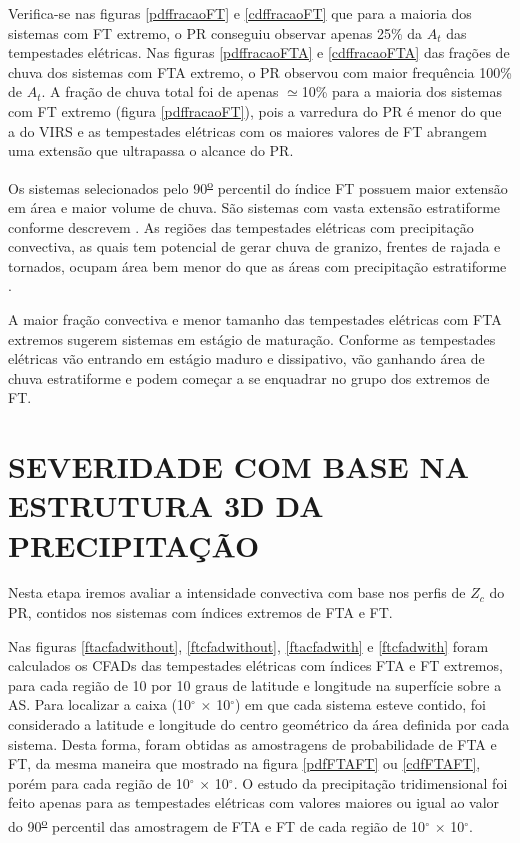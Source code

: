 Verifica-se nas figuras \ref{pdffracaoFT} e \ref{cdffracaoFT} que para a maioria dos sistemas com FT extremo, o PR conseguiu observar apenas 25\% da $A_t$ das tempestades elétricas. Nas figuras \ref{pdffracaoFTA} e \ref{cdffracaoFTA} das frações de chuva dos sistemas com FTA extremo, o PR observou com maior frequência 100\% de $A_t$. A fração de chuva total foi de apenas  $\simeq$10\% para a maioria dos sistemas com FT extremo (figura \ref{pdffracaoFT}), pois a varredura do PR é menor do que a do VIRS e as tempestades elétricas com os maiores valores de FT abrangem uma extensão que ultrapassa o alcance do PR. 


Os sistemas selecionados pelo 90\textsuperscript{\underline{o}} percentil do índice FT possuem maior extensão em área e maior volume de chuva. São sistemas com vasta extensão estratiforme conforme descrevem . As regiões das tempestades elétricas com precipitação convectiva, as quais tem potencial de gerar chuva de granizo, frentes de rajada e tornados, ocupam área bem menor do que as áreas com  precipitação estratiforme \cite{Jr2007}.

A maior fração convectiva e menor tamanho das tempestades elétricas com FTA extremos sugerem sistemas em estágio de maturação. Conforme as tempestades elétricas vão entrando em estágio maduro e dissipativo, vão ganhando área de chuva estratiforme e podem começar a se enquadrar no grupo dos extremos de FT. 


\section{SEVERIDADE COM BASE NA ESTRUTURA 3D DA PRECIPITAÇÃO}

Nesta etapa iremos avaliar a intensidade convectiva com base nos perfis de $Z_c$ do PR, contidos nos sistemas com índices extremos de FTA e FT. 

Nas figuras \ref{ftacfadwithout}, \ref{ftcfadwithout},  \ref{ftacfadwith} e \ref{ftcfadwith} foram calculados os CFADs das tempestades elétricas com índices FTA e FT extremos, para cada região de 10 por 10 graus de latitude e longitude na superfície sobre a AS. Para localizar a caixa (10$^{\circ}$ $\times$ 10$^{\circ}$) em que cada sistema esteve contido, foi considerado a latitude e longitude do centro geométrico da área definida por cada sistema. Desta forma, foram obtidas as amostragens de probabilidade de FTA e FT, da mesma maneira que mostrado na figura \ref{pdfFTAFT} ou \ref{cdfFTAFT}, porém para cada região de 10$^{\circ}$ $\times$ 10$^{\circ}$. O estudo da precipitação tridimensional foi feito apenas para as tempestades elétricas com valores maiores ou igual ao valor do    90\textsuperscript{\underline{o}} percentil das amostragem de FTA e FT de cada região de 10$^{\circ}$ $\times$ 10$^{\circ}$.

